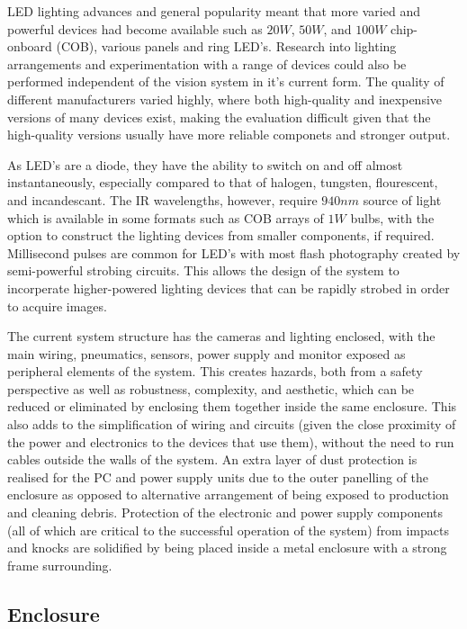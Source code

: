 \documentclass[fleqn,twoside]{article}
\begin{document}
LED lighting advances and general popularity meant that more varied and powerful devices had become available such as $20W$, $50W$, and $100W$ chip-onboard (COB), various panels and ring LED's. Research into lighting arrangements and experimentation with a range of devices could also be performed independent of the vision system in it's current form. The quality of different manufacturers varied highly, where both high-quality and inexpensive versions of many devices exist, making the evaluation difficult given that the high-quality versions usually have more reliable componets and stronger output. 

As LED's are a diode, they have the ability to switch on and off almost instantaneously, especially compared to that of halogen, tungsten, flourescent, and incandescant. The IR wavelengths, however, require $940nm$ source of light which is available in some formats such as COB arrays of $1W$ bulbs, with the option to construct the lighting devices from smaller components, if required. Millisecond pulses are common for LED's with most flash photography created by semi-powerful strobing circuits. This allows the design of the system to incorperate higher-powered lighting devices that can be rapidly strobed in order to acquire images.

The current system structure has the cameras and lighting enclosed, with the main wiring, pneumatics, sensors, power supply and monitor exposed as peripheral elements of the system. This creates hazards, both from a safety perspective as well as robustness, complexity, and aesthetic, which can be reduced or eliminated by enclosing them together inside the same enclosure. This also adds to the simplification of wiring and circuits (given the close proximity of the power and electronics to the devices that use them), without the need to run cables outside the walls of the system. An extra layer of dust protection is realised for the PC and power supply units due to the outer panelling of the enclosure as opposed to alternative arrangement of being exposed to production and cleaning debris. Protection of the electronic and power supply components (all of which are critical to the successful operation of the system) from impacts and knocks are solidified by being placed inside a metal enclosure with a strong frame surrounding.


\subsection{Enclosure}
\end{document}
